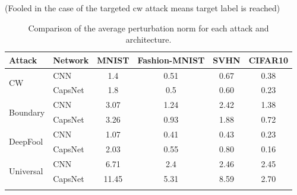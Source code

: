 \documentclass{article}
\begin{document}
(Fooled in the case of the targeted cw attack means target label is reached)

\begin{table}[h]
	\caption{Comparison of the average perturbation norm for each attack and architecture.}
	\centering
	\begin{tabular}{llcccc}
		\toprule
		Attack & Network       & MNIST & Fashion-MNIST & SVHN & CIFAR10  \\
		\midrule
		\multirow{2}{*}{CW} & CNN & 1.4 & 0.51 & 0.67 & 0.38 \\
		& CapsNet            & 1.8 & 0.5 & 0.60 & 0.23 \\
		\midrule
		\multirow{2}{*}{Boundary} & CNN & 3.07 & 1.24 & 2.42 & 1.38 \\
		& CapsNet            & 3.26 & 0.93 & 1.88 & 0.72 \\
		\midrule
		\multirow{2}{*}{DeepFool} & CNN & 1.07 & 0.41 & 0.43 & 0.23 \\
		& CapsNet           & 2.03 & 0.55 & 0.80 & 0.16 \\
		\midrule
		\multirow{2}{*}{Universal} & CNN & 6.71 & 2.4 & 2.46 & 2.45 \\
		& CapsNet           & 11.45 & 5.31 & 8.59 & 2.70 \\
		\bottomrule\\
	\end{tabular}
	\label{tab:norms}
\end{table}
\end{document}
